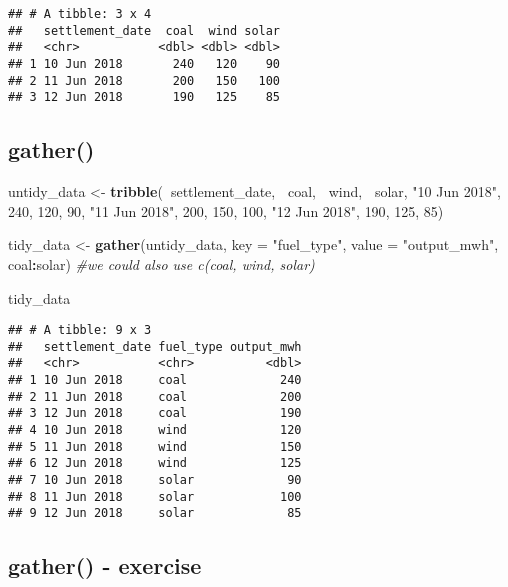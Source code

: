 \documentclass[]{article}
\newenvironment{Shaded}{\begin{snugshade}}{\end{snugshade}}
\newcommand{\KeywordTok}[1]{\textcolor[rgb]{0.13,0.29,0.53}{\textbf{#1}}}
\newcommand{\DataTypeTok}[1]{\textcolor[rgb]{0.13,0.29,0.53}{#1}}
\newcommand{\DecValTok}[1]{\textcolor[rgb]{0.00,0.00,0.81}{#1}}
\newcommand{\StringTok}[1]{\textcolor[rgb]{0.31,0.60,0.02}{#1}}
\newcommand{\CommentTok}[1]{\textcolor[rgb]{0.56,0.35,0.01}{\textit{#1}}}
\newcommand{\OperatorTok}[1]{\textcolor[rgb]{0.81,0.36,0.00}{\textbf{#1}}}
\newcommand{\NormalTok}[1]{#1}
\begin{document}
\begin{verbatim}
## # A tibble: 3 x 4
##   settlement_date  coal  wind solar
##   <chr>           <dbl> <dbl> <dbl>
## 1 10 Jun 2018       240   120    90
## 2 11 Jun 2018       200   150   100
## 3 12 Jun 2018       190   125    85
\end{verbatim}

\subsection{gather()}\label{gather-1}

\begin{Shaded}
\begin{Highlighting}[]
\NormalTok{untidy_data <-}\StringTok{ }\KeywordTok{tribble}\NormalTok{(}\OperatorTok{~}\NormalTok{settlement_date, }\OperatorTok{~}\NormalTok{coal, }\OperatorTok{~}\NormalTok{wind, }\OperatorTok{~}\NormalTok{solar,}
                    \StringTok{"10 Jun 2018"}\NormalTok{, }\DecValTok{240}\NormalTok{, }\DecValTok{120}\NormalTok{, }\DecValTok{90}\NormalTok{,}
                    \StringTok{"11 Jun 2018"}\NormalTok{, }\DecValTok{200}\NormalTok{, }\DecValTok{150}\NormalTok{, }\DecValTok{100}\NormalTok{,}
                    \StringTok{"12 Jun 2018"}\NormalTok{, }\DecValTok{190}\NormalTok{, }\DecValTok{125}\NormalTok{, }\DecValTok{85}\NormalTok{)}

\NormalTok{tidy_data <-}\StringTok{ }\KeywordTok{gather}\NormalTok{(untidy_data, }\DataTypeTok{key =} \StringTok{"fuel_type"}\NormalTok{, }\DataTypeTok{value =} \StringTok{"output_mwh"}\NormalTok{, coal}\OperatorTok{:}\NormalTok{solar) }\CommentTok{#we could also use c(coal, wind, solar)}

\NormalTok{tidy_data}
\end{Highlighting}
\end{Shaded}

\begin{verbatim}
## # A tibble: 9 x 3
##   settlement_date fuel_type output_mwh
##   <chr>           <chr>          <dbl>
## 1 10 Jun 2018     coal             240
## 2 11 Jun 2018     coal             200
## 3 12 Jun 2018     coal             190
## 4 10 Jun 2018     wind             120
## 5 11 Jun 2018     wind             150
## 6 12 Jun 2018     wind             125
## 7 10 Jun 2018     solar             90
## 8 11 Jun 2018     solar            100
## 9 12 Jun 2018     solar             85
\end{verbatim}

\subsection{gather() - exercise}\label{gather---exercise}
\end{document}
